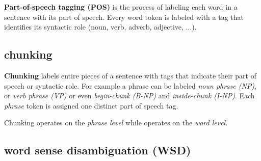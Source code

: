 \textbf{Part-of-speech tagging (POS)} is the process of labeling each word in a sentence with its part of speech. Every word token is labeled with a tag that identifies its syntactic role (noun, verb, adverb, adjective, ...).  

% 
%     




\subsection{chunking} \label{nlptask:chunking}

\textbf{Chunking} labels entire pieces of a sentence with tags that indicate their part of speech or syntactic role. For example a phrase can be labeled \emph{noun phrase (NP)}, or \emph{verb phrase (VP)} or even \emph{begin-chunk (B-NP)} and \emph{inside-chunk (I-NP)}. Each \emph{phrase} token is assigned one distinct part of speech tag. 

Chunking operates on the \emph{phrase level} while  operates on the \emph{word level}. 
% 
%     




\subsection{word sense disambiguation (WSD)} \label{nlptask:wordsensedisambiguatioNWSD}

